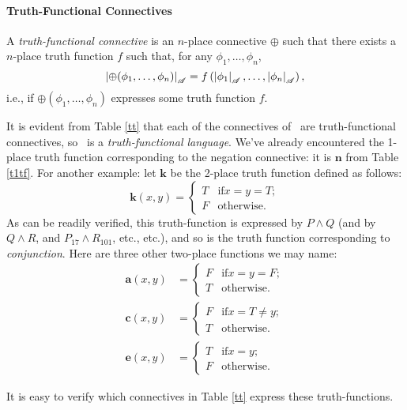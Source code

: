 \paragraph{Truth-Functional Connectives}
\begin{definition}\label{tfc}
	A \emph{truth-functional connective} is an $n$-place connective $\oplus$ such that there exists a $n$-place truth function $f$ such that, for any $\phi_{1},\ldots,\phi_{n}$, $$\left|\oplus(\phi_{1},\ldots,\phi_{n})\right|_{\mathscr{A}} = f\left(\left|\phi_{1}\right|_{\mathscr{A}},\ldots,\left|\phi_{n}\right|_{\mathscr{A}}\right),$$ i.e., if $\oplus(\phi_{1},\ldots,\phi_{n})$ expresses some truth function $f$. 
\end{definition}
It is evident from Table \ref{tt}  that each of the connectives of \lone\ are truth-functional connectives, so \lone\ is a \emph{truth-functional language}. We've already encountered the 1-place truth function corresponding to the negation connective: it is $\mathbf{n}$ from Table \ref{t1tf}. For another example: let $\mathbf{k}$ be the 2-place truth function defined as follows: $$\mathbf{k}(x,y) = \begin{cases} T &\text{if} x = y = T;\\
F &\text{otherwise}.\end{cases}$$ As can be readily verified, this truth-function is expressed by $P \wedge Q$ (and by $Q \wedge R$, and $P_{17} \wedge R_{101}$, etc., etc.), and so is the truth function corresponding to \emph{conjunction}. Here are three other two-place functions we may name:
\begin{align*}
	\mathbf{a}(x,y) &= \begin{cases} F &\text{if} x =  y = F;\\ 
T &\text{otherwise}.\end{cases}\\
 \mathbf{c}(x,y) &= \begin{cases} F &\text{if} x = T \neq y;\\
T &\text{otherwise}.\end{cases}\\
\mathbf{e}(x,y) &= \begin{cases} T &\text{if} x = y;\\
F &\text{otherwise}.\end{cases}
\end{align*}

It is easy to verify which connectives in Table \ref{tt} express these truth-functions.

